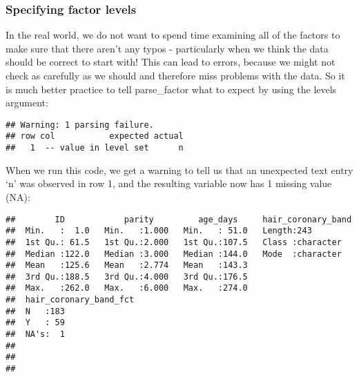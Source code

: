 \documentclass[
]{article}
\newenvironment{Shaded}{\begin{snugshade}}{\end{snugshade}}
\newcommand{\DataTypeTok}[1]{\textcolor[rgb]{0.13,0.29,0.53}{#1}}
\newcommand{\KeywordTok}[1]{\textcolor[rgb]{0.13,0.29,0.53}{\textbf{#1}}}
\newcommand{\NormalTok}[1]{#1}
\newcommand{\OperatorTok}[1]{\textcolor[rgb]{0.81,0.36,0.00}{\textbf{#1}}}
\newcommand{\StringTok}[1]{\textcolor[rgb]{0.31,0.60,0.02}{#1}}
\begin{document}
\hypertarget{specifying-factor-levels}{%
\subsubsection{Specifying factor
levels}\label{specifying-factor-levels}}

In the real world, we do not want to spend time examining all of the
factors to make sure that there aren't any typos - particularly when we
think the data should be correct to start with! This can lead to errors,
because we might not check as carefully as we should and therefore miss
problems with the data. So it is much better practice to tell
parse\_factor what to expect by using the levels argument:

\begin{Shaded}
\end{Shaded}

\begin{verbatim}
## Warning: 1 parsing failure.
## row col           expected actual
##   1  -- value in level set      n
\end{verbatim}

When we run this code, we get a warning to tell us that an unexpected
text entry `n' was observed in row 1, and the resulting variable now has
1 missing value (NA):

\begin{Shaded}
\end{Shaded}

\begin{verbatim}
##        ID            parity         age_days     hair_coronary_band
##  Min.   :  1.0   Min.   :1.000   Min.   : 51.0   Length:243        
##  1st Qu.: 61.5   1st Qu.:2.000   1st Qu.:107.5   Class :character  
##  Median :122.0   Median :3.000   Median :144.0   Mode  :character  
##  Mean   :125.6   Mean   :2.774   Mean   :143.3                     
##  3rd Qu.:188.5   3rd Qu.:4.000   3rd Qu.:176.5                     
##  Max.   :262.0   Max.   :6.000   Max.   :274.0                     
##  hair_coronary_band_fct
##  N   :183              
##  Y   : 59              
##  NA's:  1              
##                        
##                        
## 
\end{verbatim}
\end{document}
